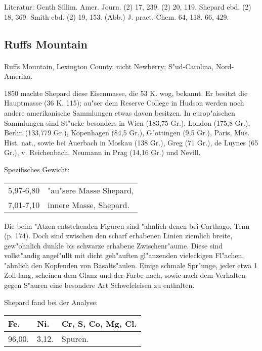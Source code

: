 \documentclass[a4paper, 11pt, oneside]{article}
\begin{document}
\footnotesize
Literatur: Genth Sillim. Amer. Journ. (2) 17, 239. (2) 20, 119. Shepard ebd. (2) 18, 369. Smith ebd. (2) 19, 153. (Abb.) J. pract. Chem. 64, 118. 66, 429.

\subsection{Ruffs Mountain}
\normalsize
\paragraph{}
Ruffs Mountain, Lexington County, nicht Newberry; S"ud-Carolina, Nord-Amerika.

1850 machte Shepard diese Eisenmasse, die 53 K. wog, bekannt. Er besitzt die Hauptmasse (36 K. 115); au"ser dem Reserve College in Hudson werden noch andere amerikanische Sammlungen etwas davon besitzen. In europ"aischen Sammlungen sind St"ucke besonders in Wien (183,75 Gr.), London (175,8 Gr.), Berlin (133,779 Gr.), Kopenhagen (84,5 Gr.), G"ottingen (9,5 Gr.), Paris, Mus. Hist. nat., sowie bei Auerbach in Moskau (138 Gr.), Greg (71 Gr.), de Luynes (65 Gr.), v. Reichenbach, Neumann in Prag (14,16 Gr.) und Nevill.

Spezifisches Gewicht:  
\begin{table}[!ht]
    \centering
    \begin{tabular}{l l}
        5,97-6,80 & "au"sere Masse Shepard,\\
        7,01-7,10 & innere Masse, Shepard.
    \end{tabular}
\end{table}

Die beim "Atzen entstehenden Figuren sind "ahnlich denen bei Carthago, Tenn (p. 174). Doch sind zwischen den scharf erhabenen Linien ziemlich breite, gew"ohnlich dunkle bis schwarze erhabene Zwischenr"aume. Diese sind vollst"andig angef"ullt mit dicht geh"auften gl"anzenden vieleckigen Fl"achen, "ahnlich den Kopfenden von Basalts"aulen. Einige schmale Spr"unge, jeder etwa 1 Zoll lang, scheinen dem Glanz und der Farbe nach, sowie nach dem Verhalten gegen S"auren eine besondere Art Schwefeleisen zu enthalten.

Shepard fand bei der Analyse:
\begin{table}[H]
    \centering
    \begin{tabular}{l l l}
        Fe. & Ni. & Cr, S, Co, Mg, Cl. \\ \hline
        96,00. & 3,12. & Spuren. \\
    \end{tabular}
\end{table}
\end{document}
